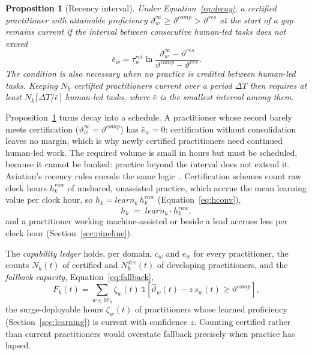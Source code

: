 \documentclass[utf8]{FrontiersinHarvard}
\newtheorem{Proposition}{Proposition}
\begin{document}
	\begin{Proposition}[Recency interval]
		\label{prop:recency}
		Under Equation~\eqref{eq:decay}, a certified practitioner with attainable proficiency $\vartheta^{\infty}_w\ge\vartheta^{comp}>\vartheta^{res}$ at the start of a gap remains current if the interval between consecutive human-led tasks does not exceed
		\begin{equation}
			\bar e_w = \tau^{ret}_w \ln\frac{\vartheta^{\infty}_w - \vartheta^{res}}{\vartheta^{comp}-\vartheta^{res}} .
			\label{eq:recency}
		\end{equation}
		The condition is also necessary when no practice is credited between human-led tasks. Keeping $N_k$ certified practitioners current over a period $\Delta T$ then requires at least $N_k\lceil \Delta T/\bar e\rceil$ human-led tasks, where $\bar e$ is the smallest interval among them.
	\end{Proposition}

	Proposition~\ref{prop:recency} turns decay into a schedule. A practitioner whose record barely meets certification ($\vartheta^{\infty}_w=\vartheta^{comp}$) has $\bar e_w=0$: certification without consolidation leaves no margin, which is why newly certified practitioners need continued human-led work. The required volume is small in hours but must be scheduled, because it cannot be banked: practice beyond the interval does not extend it. Aviation's recency rules encode the same logic~\citep{FAA6157}. Certification schemes count raw clock hours $h^{raw}_k$ of unshared, unassisted practice, which accrue the mean learning value per clock hour, so $h_k = \overline{learn}_k\,h^{raw}_k$ (Equation~\eqref{eq:hconv}),
	\begin{equation}
		h_k \;=\; \overline{learn}_k \cdot h^{raw}_k ,
		\label{eq:hconv}
	\end{equation}
	and a practitioner working machine-assisted or beside a lead accrues less per clock hour (Section~\ref{sec:pipeline}).

	The \textit{capability ledger} holds, per domain, $c_w$ and $e_w$ for every practitioner, the counts $N_k(t)$ of certified and $N^{dev}_k(t)$ of developing practitioners, and the \textit{fallback capacity}, Equation~\eqref{eq:fallback},
	\begin{equation}
		F_k(t) = \sum_{w\in\mathcal{W}_k} \zeta_w(t)\,\mathbb{1}\!\left[\hat\vartheta_w(t) - z\,s_w(t) \ge \vartheta^{comp}\right],
		\label{eq:fallback}
	\end{equation}
	the surge-deployable hours $\zeta_w(t)$ of practitioners whose learned proficiency (Section~\ref{sec:learning}) is current with confidence $z$. Counting certified rather than current practitioners would overstate fallback precisely when practice has lapsed.
\end{document}
